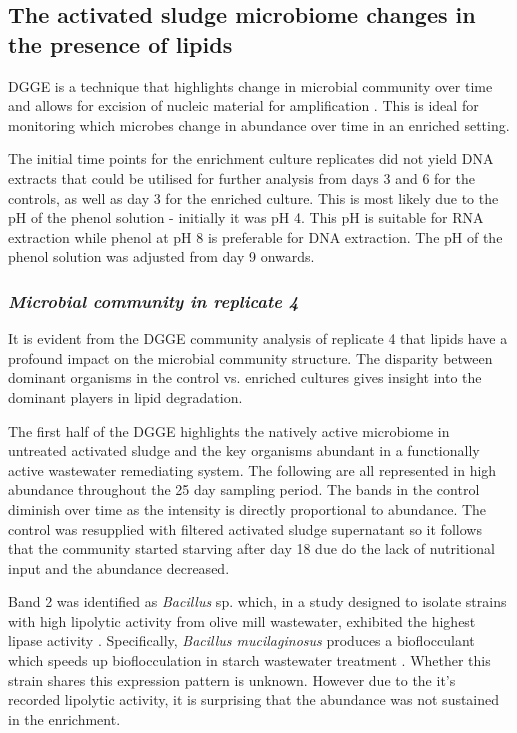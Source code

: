 \documentclass[11pt]{article}
\begin{document}
\subsection{The activated sludge microbiome changes in the presence of lipids}
DGGE is a technique that highlights change in microbial community over time and allows for excision of nucleic material for amplification \cite{yang2012evolution}. This is ideal for monitoring which microbes change in abundance over time in an enriched setting.



The initial time points for the enrichment culture replicates did not yield DNA extracts that could be utilised for further analysis from days 3 and 6 for the controls, as well as day 3 for the enriched culture. This is most likely due to the pH of the phenol solution - initially it was pH 4. This pH is suitable for RNA extraction while phenol at pH 8 is preferable for DNA extraction. The pH of the phenol solution was adjusted from day 9 onwards.

\subsubsection{\emph{Microbial community in replicate 4}}
It is evident from the DGGE community analysis of replicate 4 that lipids have a profound impact on the microbial community structure. The disparity between dominant organisms in the control vs. enriched cultures gives insight into the dominant players in lipid degradation. 

The first half of the DGGE highlights the natively active microbiome in untreated activated sludge and the key organisms abundant in a functionally active wastewater remediating system. The following are all represented in high abundance throughout the 25 day sampling period. The bands in the control diminish over time as the intensity is directly proportional to abundance. The control was resupplied with filtered activated sludge supernatant so it follows that the community started starving after day 18 due do the lack of nutritional input and the abundance decreased.

Band 2 was identified as \emph{Bacillus} sp. which, in a study designed to isolate strains with high lipolytic activity from olive mill wastewater, exhibited the highest lipase activity \cite{ertuugrul2007isolation}. Specifically, \emph{Bacillus mucilaginosus} produces a bioflocculant which speeds up bioflocculation in starch wastewater treatment \cite{deng2003characteristics}. Whether this strain shares this expression pattern is unknown. However due to the it's recorded lipolytic activity, it is surprising that the abundance was not sustained in the enrichment.
\end{document}
